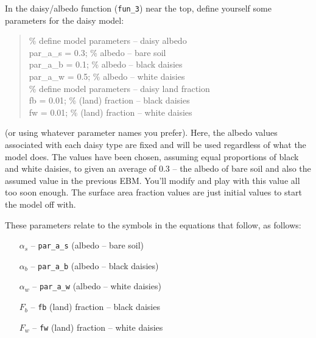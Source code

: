 \documentclass{tufte-book} %
\newenvironment{docspec}{\begin{quotation}\ttfamily\parskip0pt\parindent0pt\ignorespaces}{\end{quotation}}
\begin{document}
In the daisy/albedo function (\texttt{fun\_3})  near the top, define yourself some parameters for the daisy model:
\begin{docspec}
\% define model parameters -- daisy albedo
\\par\_a\_s = 0.3; \% albedo -- bare soil
\\par\_a\_b = 0.1; \% albedo -- black daisies
\\par\_a\_w = 0.5; \% albedo -- white daisies
\\\% define model parameters -- daisy land fraction
\\fb = 0.01; \% (land) fraction -- black daisies
\\fw = 0.01; \% (land) fraction -- white daisies
\end{docspec}
(or using whatever parameter names you prefer). Here, the albedo values associated with each daisy type are fixed and will be used regardless of what the model does. The values have been chosen, assuming equal proportions of black and white daisies, to given an average of 0.3 -- the albedo of bare soil and also the assumed value in the previous EBM. You'll modify and play with this value all too soon enough. The surface area fraction values are just initial values to start the model off with.

These parameters relate to the symbols in the equations that follow, as follows:

\begin{itemize}[noitemsep]
\setlength{\itemindent}{.2in}
\item[\(\alpha_{s}\)] -- \texttt{par\_a\_s} (albedo -- bare soil)
\item[\(\alpha_{b}\)] -- \texttt{par\_a\_b} (albedo -- black daisies)
\item[\(\alpha_{w}\)] -- \texttt{par\_a\_w} (albedo -- white daisies)
\item[\(F_{b}\)] -- \texttt{fb} (land) fraction -- black daisies
\item[\(F_{w}\)] -- \texttt{fw} (land) fraction -- white daisies
\end{itemize}
\vspace{0mm}
\end{document}
